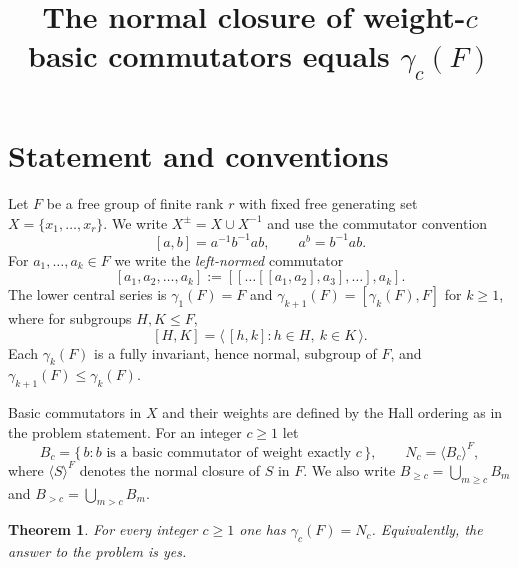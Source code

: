 \documentclass{amsart}
\newtheorem{theorem}{Theorem}
\theoremstyle{definition}
\theoremstyle{remark}
\begin{document}
\title{The normal closure of weight-$c$ basic commutators equals $\gamma_c(F)$}
\maketitle

\section{Statement and conventions}

Let $F$ be a free group of finite rank $r$ with fixed free generating set
$X=\{x_1,\dots,x_r\}$. We write $X^{\pm}=X\cup X^{-1}$ and use the commutator
convention
\[
[a,b]=a^{-1}b^{-1}ab ,\qquad a^{b}=b^{-1}ab .
\]
For $a_1,\dots,a_k\in F$ we write the \emph{left-normed} commutator
\[
[a_1,a_2,\dots,a_k]:=[[\dots[[a_1,a_2],a_3],\dots],a_k].
\]
The lower central series is $\gamma_1(F)=F$ and $\gamma_{k+1}(F)=[\gamma_k(F),F]$
for $k\ge 1$, where for subgroups $H,K\le F$,
\[
[H,K]=\big\langle\, [h,k] : h\in H,\ k\in K \,\big\rangle .
\]
Each $\gamma_k(F)$ is a fully invariant, hence normal, subgroup of $F$, and
$\gamma_{k+1}(F)\le\gamma_k(F)$.

Basic commutators in $X$ and their weights are defined by the Hall ordering as in
the problem statement. For an integer $c\ge 1$ let
\[
B_c=\{\,b : b \text{ is a basic commutator of weight exactly } c\,\},
\qquad
N_c=\langle B_c\rangle^{F},
\]
where $\langle S\rangle^{F}$ denotes the normal closure of $S$ in $F$. We also
write $B_{\ge c}=\bigcup_{m\ge c}B_m$ and $B_{>c}=\bigcup_{m>c}B_m$.

\begin{theorem}\label{thm:main}
For every integer $c\ge 1$ one has $\gamma_c(F)=N_c$. Equivalently, the answer to
the problem is \emph{yes}.
\end{theorem}
\end{document}
